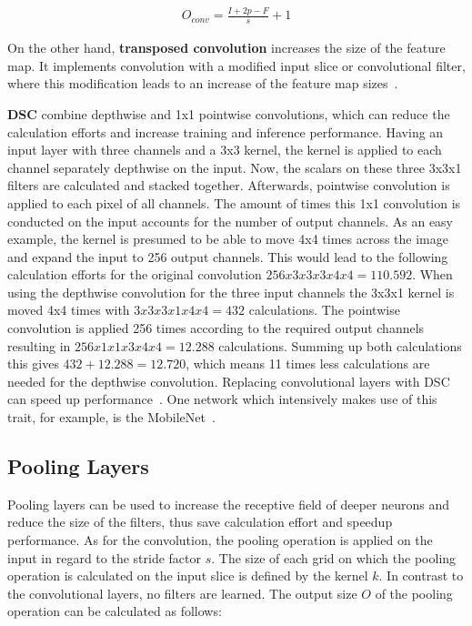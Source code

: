 \begin{align}
    O_{conv}=\frac{I+2p-F}{s}+1
\end{align}

On the other hand, \textbf{transposed convolution} increases the size of the feature map.
It implements convolution with a modified input slice or convolutional filter, where this modification leads
to an increase of the feature map sizes~\cite{deconv}.

\textbf{\gls{DSC}} combine depthwise and 1x1 pointwise convolutions, which can reduce the calculation efforts and increase
training and inference performance.
Having an input layer with three channels and a 3x3 kernel, the kernel is applied to each channel
separately depthwise on the input.
Now, the scalars on these three 3x3x1 filters are calculated and stacked together.
Afterwards, pointwise convolution is applied to each pixel of all channels.
The amount of times this 1x1 convolution is conducted on the input accounts for the number of output channels.
As an easy example, the kernel is presumed to be able to move 4x4 times across the image and expand the input to 256 output channels.
This would lead to the following calculation efforts for the original convolution
$256x3x3x3x4x4=110.592$.
When using the depthwise convolution for the three input channels the 3x3x1 kernel is moved 4x4 times
with $3x3x3x1x4x4=432$ calculations.
The pointwise convolution is applied 256 times according to the required output channels resulting in
$256x1x1x3x4x4=12.288$ calculations.
Summing up both calculations this gives $432+12.288=12.720$,
which means 11 times less calculations are needed for the depthwise convolution.
Replacing convolutional layers with \gls{DSC} can speed up performance~\cite{advanceddeeplearningpython}.
One network which intensively makes use of this trait, for example, is the MobileNet~\cite{mobilenet}.


\subsection{Pooling Layers}
Pooling layers can be used to increase the receptive field of deeper neurons and reduce the size of the filters,
thus save calculation effort and speedup performance.
As for the convolution, the pooling operation is applied on the input in regard to the stride factor $s$.
The size of each grid on which the pooling operation is calculated on the input slice is defined by the kernel $k$.
In contrast to the convolutional layers, no filters are learned.
The output size $O$ of the pooling operation can be calculated as follows:

